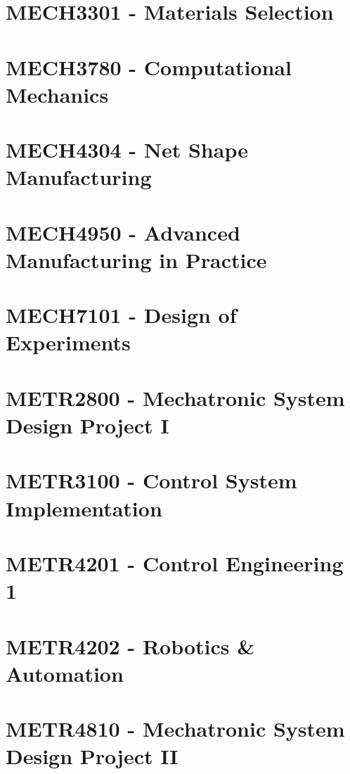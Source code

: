 \documentclass[a4paper,12pt]{report}
\begin{document}
\hypertarget{MECH3301}{\section{MECH3301 - Materials Selection}}

\hypertarget{MECH3780}{\section{MECH3780 - Computational Mechanics}}

\hypertarget{MECH4304}{\section{MECH4304 - Net Shape Manufacturing}}

\hypertarget{MECH4950}{\section{MECH4950 - Advanced Manufacturing in Practice}}

\hypertarget{MECH7101}{\section{MECH7101 - Design of Experiments}}

\hypertarget{METR2800}{\section{METR2800 - Mechatronic System Design Project I}}

\hypertarget{METR3100}{\section{METR3100 - Control System Implementation}}

\hypertarget{METR4201}{\section{METR4201 - Control Engineering 1}}

\hypertarget{METR4202}{\section{METR4202 - Robotics \& Automation}}

\hypertarget{METR4810}{\section{METR4810 - Mechatronic System Design Project II}}
\end{document}
